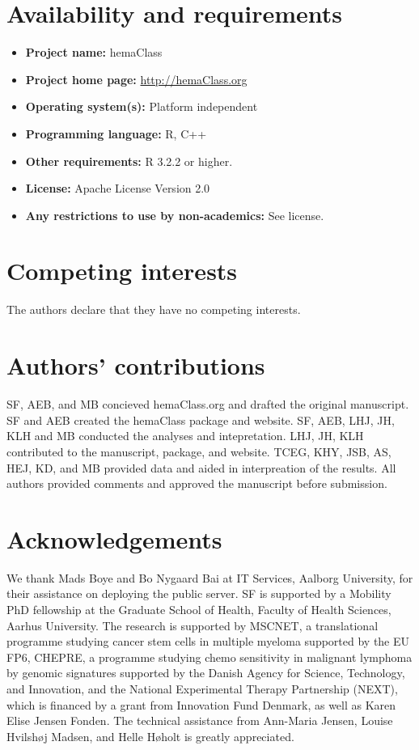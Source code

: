 \documentclass[twocolumn]{bmcart}%
\begin{document}
\begin{backmatter}

\section*{Availability and requirements}
\begin{itemize}
  \item \textbf{Project name:} hemaClass
  \item \textbf{Project home page:} \url{http://hemaClass.org}
  \item \textbf{Operating system(s):} Platform independent
  \item \textbf{Programming language:} \textsf{R}, \textsf{C++}
  \item \textbf{Other requirements:} R 3.2.2 or higher.
  \item \textbf{License:} Apache License Version 2.0
  \item \textbf{Any restrictions to use by non-academics:} See license.
\end{itemize}

\section*{Competing interests}
The authors declare that they have no competing interests.

\section*{Authors' contributions}
SF, AEB, and MB concieved hemaClass.org and drafted the original manuscript.
SF and AEB created the hemaClass package and website.
SF, AEB, LHJ, JH, KLH and MB conducted the analyses and intepretation.
LHJ, JH, KLH contributed to the manuscript, package, and website.
TCEG, KHY, JSB, AS, HEJ, KD, and MB provided data and aided in interpreation of
the results.
All authors provided comments and approved the manuscript before submission.

\section*{Acknowledgements}
We thank Mads Boye and Bo Nygaard Bai at IT Services, Aalborg University, for their assistance on deploying the public server.
SF is supported by a Mobility PhD fellowship at the Graduate School of Health, Faculty of Health Sciences, Aarhus University.
The research is supported by MSCNET, a translational programme studying cancer stem cells in multiple myeloma supported by the EU FP6, CHEPRE, a programme studying chemo sensitivity in malignant lymphoma by genomic signatures supported by the Danish Agency for Science, Technology, and Innovation, and the National Experimental Therapy Partnership (NEXT), which is financed by a grant from Innovation Fund Denmark, as well as Karen Elise Jensen Fonden.
The technical assistance from Ann-Maria Jensen, Louise Hvilsh{\o}j Madsen, and Helle H{\o}holt is greatly appreciated.


\end{backmatter}
\end{document}
